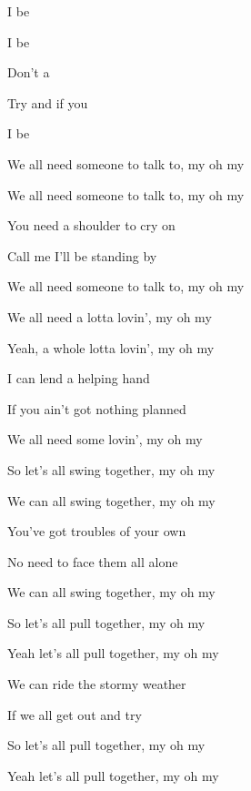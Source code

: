 

\zs
I be  

I be  

Don't a  

Try and  if you 

I be  
\ks

\zs
We all need someone to talk to, my oh my

We all need someone to talk to, my oh my

You need a shoulder to cry on

Call me I'll be standing by

We all need someone to talk to, my oh my
\ks

\zs
We all need a lotta lovin', my oh my

Yeah, a whole lotta lovin', my oh my

I can lend a helping hand

If you ain't got nothing planned

We all need some lovin', my oh my
\ks

\zs
So let's all swing together, my oh my

We can all swing together, my oh my

You've got troubles of your own

No need to face them all alone

We can all swing together, my oh my
\ks

\zs
So let's all pull together, my oh my

Yeah let's all pull together, my oh my

We can ride the stormy weather

If we all get out and try

So let's all pull together, my oh my

Yeah let's all pull together, my oh my
\ks

\kp
